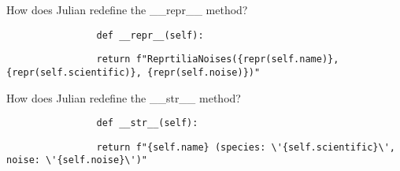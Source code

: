 \begin{blocksection}
    \begin{blocksection}
        \question How does Julian redefine the __repr__ method?
    
        \vspace{1.5\baselineskip}
        
        \begin{lstlisting}
                def __repr__(self):
        \end{lstlisting}
        \begin{solution}[0.25in]
        \begin{lstlisting}
                return f"ReprtiliaNoises({repr(self.name)}, {repr(self.scientific)}, {repr(self.noise)})"
        \end{lstlisting}
        \end{solution}
    \end{blocksection}

    \begin{blocksection}
        \question How does Julian redefine the __str__ method?
    
        \vspace{1.5\baselineskip}
        
        \begin{lstlisting}
                def __str__(self):
        \end{lstlisting}
        \begin{solution}[0.25in]
        \begin{lstlisting}
                return f"{self.name} (species: \'{self.scientific}\', noise: \'{self.noise}\')"
        \end{lstlisting}
        \end{solution}
    \end{blocksection}
\end{blocksection}    
    